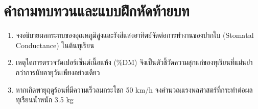 \section{คำถามทบทวนและแบบฝึกหัดท้ายบท}
\begin{enumerate}
    \item จงอธิบายผลกระทบของอุณหภูมิสูงและรังสีแสงอาทิตย์จัดต่อการทำงานของปากใบ (Stomatal Conductance) ในต้นทุเรียน
    \item เหตุใดการตรวจวัดเปอร์เซ็นต์เนื้อแห้ง (\%DM) จึงเป็นตัวชี้วัดความสุกแก่ของทุเรียนที่แม่นยำกว่าการนับอายุวันเพียงอย่างเดียว
    \item หากเกิดพายุฤดูร้อนที่มีความเร็วลมกระโชก 50 km/h จงคำนวณแรงพลศาสตร์ที่กระทำต่อผลทุเรียนน้ำหนัก 3.5 kg
\end{enumerate}
